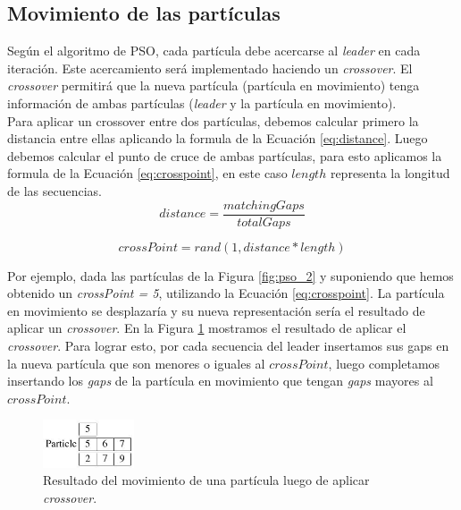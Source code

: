 \documentclass{cup-pan}
\begin{document}
	\subsection{Movimiento de las partículas}
	Según el algoritmo de PSO, cada partícula debe acercarse al \textit{leader} en cada iteración. Este acercamiento será implementado haciendo un \textit{crossover}. El \textit{crossover} permitirá que la nueva partícula (partícula en movimiento) tenga información de ambas partículas (\textit{leader} y la partícula en movimiento).  \\
	
	Para aplicar un crossover entre dos partículas, debemos calcular primero la distancia entre ellas aplicando la formula de la Ecuación \ref{eq:distance}. Luego debemos calcular el punto de cruce de ambas partículas, para esto aplicamos la formula de la Ecuación \ref{eq:crosspoint}, en este caso $length$ representa la longitud de las secuencias.\\
	
	
	
	\begin{equation}\label{eq:distance}
		distance =  \dfrac{ matchingGaps }{totalGaps} 
	\end{equation}
	
	\begin{equation}\label{eq:crosspoint}
	crossPoint =  rand( 1, distance*length )
	\end{equation}

	Por ejemplo, dada las partículas de la Figura \ref{fig:pso_2} y suponiendo que hemos obtenido un \textit{crossPoint = 5},  utilizando la Ecuación \ref{eq:crosspoint}. La partícula en movimiento se desplazaría y su nueva representación sería el resultado de aplicar un \textit{crossover}. En la Figura \ref{fig:pso_3} mostramos el resultado de aplicar el \textit{crossover}. Para lograr esto, por cada secuencia del leader insertamos sus gaps en la nueva partícula que son menores o iguales al $crossPoint$, luego completamos insertando los \textit{gaps} de la partícula en movimiento que tengan \textit{gaps} mayores al $crossPoint$.
	
	
	
	\begin{figure}[h]
		\centering
		\includegraphics[width=0.24\textwidth]{images/pso_3}
		\caption{Resultado del movimiento de una partícula luego de aplicar \textit{crossover}.}
		\label{fig:pso_3}
	\end{figure}
\end{document}
